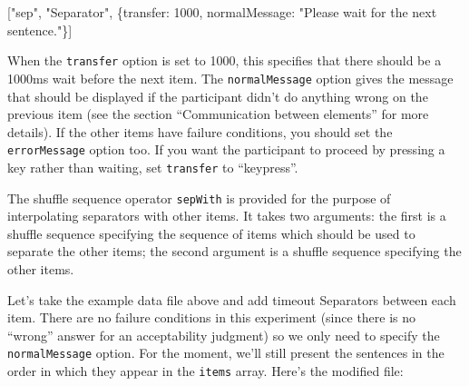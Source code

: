 \documentclass[]{article}
\newenvironment{Shaded}{}{}
\newcommand{\DataTypeTok}[1]{\textcolor[rgb]{0.56,0.13,0.00}{{#1}}}
\newcommand{\DecValTok}[1]{\textcolor[rgb]{0.25,0.63,0.44}{{#1}}}
\newcommand{\StringTok}[1]{\textcolor[rgb]{0.25,0.44,0.63}{{#1}}}
\newcommand{\NormalTok}[1]{{#1}}
\begin{document}
\begin{Shaded}
\begin{Highlighting}[]
    \NormalTok{[}\StringTok{"sep"}\NormalTok{, }\StringTok{"Separator"}\NormalTok{, \{}\DataTypeTok{transfer}\NormalTok{: }\DecValTok{1000}\NormalTok{, }\DataTypeTok{normalMessage}\NormalTok{: }\StringTok{"Please wait for the next sentence."}\NormalTok{\}]}
\end{Highlighting}
\end{Shaded}

When the \texttt{transfer} option is set to 1000, this specifies that
there should be a 1000ms wait before the next item. The
\texttt{normalMessage} option gives the message that should be displayed
if the participant didn't do anything wrong on the previous item (see
the section ``Communication between elements'' for more details). If the
other items have failure conditions, you should set the
\texttt{errorMessage} option too. If you want the participant to proceed
by pressing a key rather than waiting, set \texttt{transfer} to
``keypress''.

The shuffle sequence operator \texttt{sepWith} is provided for the
purpose of interpolating separators with other items. It takes two
arguments: the first is a shuffle sequence specifying the sequence of
items which should be used to separate the other items; the second
argument is a shuffle sequence specifying the other items.

Let's take the example data file above and add timeout Separators
between each item. There are no failure conditions in this experiment
(since there is no ``wrong'' answer for an acceptability judgment) so we
only need to specify the \texttt{normalMessage} option. For the moment,
we'll still present the sentences in the order in which they appear in
the \texttt{items} array. Here's the modified file:
\end{document}
